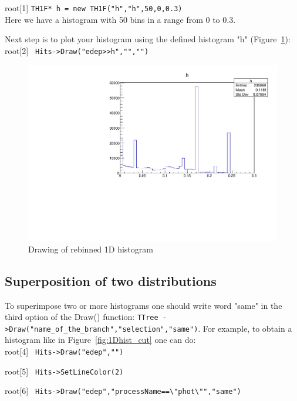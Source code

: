 \documentclass[12pt]{article}
\begin{document}
root[1] \verb|TH1F* h = new TH1F("h","h",50,0,0.3) |\\

Here  we have a histogram with 50 bins in a range from 0 to 0.3.

Next step is to plot your histogram using the defined histogram "h" (Figure~\ref{fig:rebin}): \\

root[2] \verb| Hits->Draw("edep>>h","","") |

\begin{figure}[h]
\centering
\includegraphics[scale=0.5]{figs/1Drebinning.pdf}
\caption{Drawing of rebinned 1D histogram}
\label{fig:rebin}
\end{figure}


\clearpage
\subsection{Superposition of two distributions}
 To superimpose two or more histograms one should write word "same" in the third option of the Draw() function: \verb|TTree ->Draw("name_of_the_branch","selection","same")|. For example, to obtain a histogram like in Figure~\ref{fig:1Dhist_cut} one can do: \\

root[4] \verb| Hits->Draw("edep","") |

root[5] \verb| Hits->SetLineColor(2)|

root[6] \verb| Hits->Draw("edep","processName==\"phot\"","same") |\\
\end{document}
